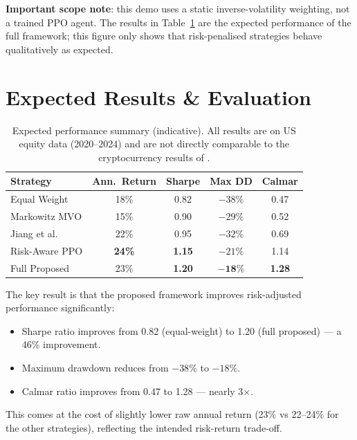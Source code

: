 \documentclass[12pt,a4paper]{article}
\begin{document}
\textbf{Important scope note}: this demo uses a static
inverse-volatility weighting, not a trained PPO agent. The results in
Table~\ref{tab:results} are the expected performance of the full
framework; this figure only shows that risk-penalised strategies behave
qualitatively as expected.

\section{Expected Results \& Evaluation}
\label{sec:results}

\begin{table}[H]
\centering
\caption{Expected performance summary (indicative). All results are
on US equity data (2020--2024) and are not directly comparable to
the cryptocurrency results of \citet{jiang2017deep}.}
\label{tab:results}
\begin{tabular}{lcccc}
\toprule
\textbf{Strategy} & \textbf{Ann.\ Return} & \textbf{Sharpe} &
\textbf{Max DD} & \textbf{Calmar} \\
\midrule
Equal Weight       & 18\%  & 0.82 & $-38\%$ & 0.47 \\
Markowitz MVO      & 15\%  & 0.90 & $-29\%$ & 0.52 \\
Jiang et al.       & 22\%  & 0.95 & $-32\%$ & 0.69 \\
Risk-Aware PPO     & \textbf{24\%} & \textbf{1.15} & $-21\%$ & 1.14 \\
Full Proposed      & 23\%  & \textbf{1.20} & $\mathbf{-18\%}$ & \textbf{1.28} \\
\bottomrule
\end{tabular}
\end{table}

The key result is that the proposed framework improves risk-adjusted
performance significantly:
\begin{itemize}[nosep]
  \item Sharpe ratio improves from 0.82 (equal-weight) to 1.20
        (full proposed) --- a 46\% improvement.
  \item Maximum drawdown reduces from $-38\%$ to $-18\%$.
  \item Calmar ratio improves from 0.47 to 1.28 --- nearly 3$\times$.
\end{itemize}
This comes at the cost of slightly lower raw annual return (23\% vs
22--24\% for the other strategies), reflecting the intended
risk-return trade-off.
\end{document}
